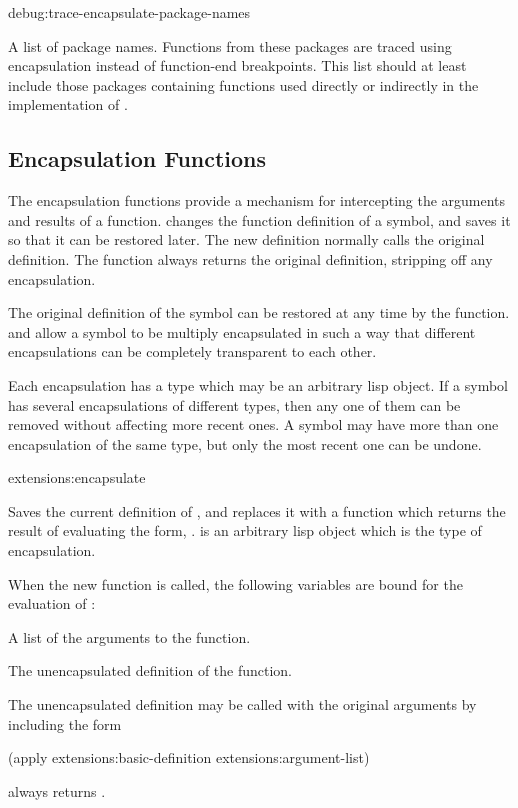 \begin{defvar}{debug:}{trace-encapsulate-package-names}
  
  A list of package names.  Functions from these packages are traced
  using encapsulation instead of function-end breakpoints.  This list
  should at least include those packages containing functions used
  directly or indirectly in the implementation of .
\end{defvar}


\subsection{Encapsulation Functions}

The encapsulation functions provide a mechanism for intercepting the
arguments and results of a function.   changes the
function definition of a symbol, and saves it so that it can be
restored later.  The new definition normally calls the original
definition.  The \clisp{}  function always returns
the original definition, stripping off any encapsulation.

The original definition of the symbol can be restored at any time by
the  function.   and 
allow a symbol to be multiply encapsulated in such a way that different
encapsulations can be completely transparent to each other.

Each encapsulation has a type which may be an arbitrary lisp object.
If a symbol has several encapsulations of different types, then any
one of them can be removed without affecting more recent ones.
A symbol may have more than one encapsulation of the same type, but
only the most recent one can be undone.

\begin{defun}{extensions:}{encapsulate}{%
    }
  
  Saves the current definition of , and replaces it with a
  function which returns the result of evaluating the form,
  .   is an arbitrary lisp object which is the
  type of encapsulation.
  
  When the new function is called, the following variables are bound
  for the evaluation of :
  \begin{Lentry}
    
  \item[\code{extensions:argument-list}] A list of the arguments to
    the function.
    
  \item[\code{extensions:basic-definition}] The unencapsulated
    definition of the function.
  \end{Lentry}
  The unencapsulated definition may be called with the original
  arguments by including the form
  \begin{lisp}
    (apply extensions:basic-definition extensions:argument-list)
  \end{lisp}

   always returns .
\end{defun}

